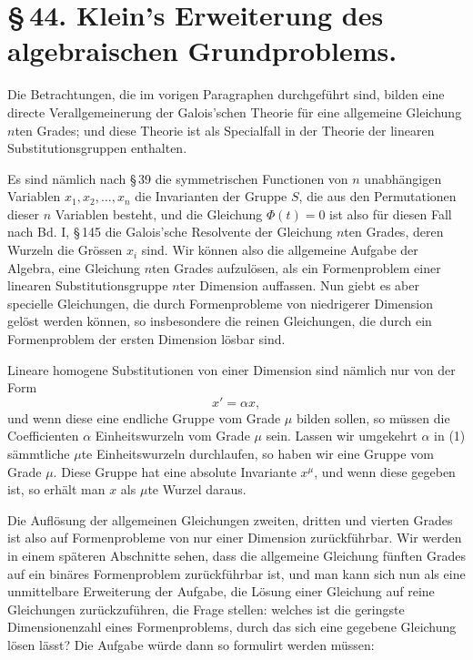 \documentclass[11pt]{article}
\begin{document}
\section*{\S\,44. Klein's Erweiterung des algebraischen Grundproblems.}

Die Betrachtungen, die im vorigen Paragraphen durchgeführt sind, bilden eine directe Verallgemeinerung der Galois'schen Theorie für eine allgemeine Gleichung $n$ten Grades; und diese Theorie ist als Specialfall in der Theorie der linearen Substitutionsgruppen enthalten.

Es sind nämlich nach \S\,39 die symmetrischen Functionen von $n$ unabhängigen Variablen $x_1,x_2,\ldots,x_n$ die Invarianten der Gruppe $S$, die aus den Permutationen dieser $n$ Variablen besteht, und die Gleichung $\Phi(t)=0$ ist also für diesen Fall nach Bd. I, \S\,145 die Galois'sche Resolvente der Gleichung $n$ten Grades, deren Wurzeln die Grössen $x_i$ sind. Wir können also die allgemeine Aufgabe der Algebra, eine Gleichung $n$ten Grades aufzulösen, als ein Formenproblem einer linearen Substitutionsgruppe $n$ter Dimension auffassen. Nun giebt es aber specielle Gleichungen, die durch Formenprobleme von niedrigerer Dimension gelöst werden können, so insbesondere die reinen Gleichungen, die durch ein Formenproblem der ersten Dimension lösbar sind.

Lineare homogene Substitutionen von einer Dimension sind nämlich nur von der Form
\begin{equation}
x'=\alpha x,
\tag{1}
\end{equation}
und wenn diese eine endliche Gruppe vom Grade $\mu$ bilden sollen, so müssen die Coefficienten $\alpha$ Einheitswurzeln vom Grade $\mu$ sein. Lassen wir umgekehrt $\alpha$ in (1) sämmtliche $\mu$te Einheitswurzeln durchlaufen, so haben wir eine Gruppe vom Grade $\mu$. Diese Gruppe hat eine absolute Invariante $x^\mu$, und wenn diese gegeben ist, so erhält man $x$ als $\mu$te Wurzel daraus.

\clearpage


Die Auflösung der allgemeinen Gleichungen zweiten, dritten und vierten Grades ist also auf Formenprobleme von nur einer Dimension zurückführbar. Wir werden in einem späteren Abschnitte sehen, dass die allgemeine Gleichung fünften Grades auf ein binäres Formenproblem zurückführbar ist, und man kann sich nun als eine unmittelbare Erweiterung der Aufgabe, die Lösung einer Gleichung auf reine Gleichungen zurückzuführen, die Frage stellen: welches ist die geringste Dimensionenzahl eines Formenproblems, durch das sich eine gegebene Gleichung lösen lässt? Die Aufgabe würde dann so formulirt werden müssen:
\end{document}
